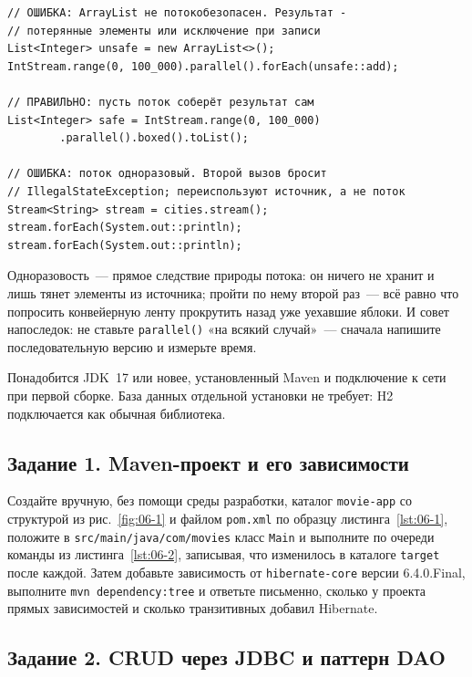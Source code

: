 \begin{listing}[H]
\begin{verbatim}
// ОШИБКА: ArrayList не потокобезопасен. Результат -
// потерянные элементы или исключение при записи
List<Integer> unsafe = new ArrayList<>();
IntStream.range(0, 100_000).parallel().forEach(unsafe::add);

// ПРАВИЛЬНО: пусть поток соберёт результат сам
List<Integer> safe = IntStream.range(0, 100_000)
        .parallel().boxed().toList();

// ОШИБКА: поток одноразовый. Второй вызов бросит
// IllegalStateException; переиспользуют источник, а не поток
Stream<String> stream = cities.stream();
stream.forEach(System.out::println);
stream.forEach(System.out::println);
\end{verbatim}
\caption{Ошибки параллельного и повторного использования потока}
\label{lst:06-21}
\end{listing}

Одноразовость~--- прямое следствие природы потока: он ничего не хранит и лишь
тянет элементы из источника; пройти по нему второй раз~--- всё равно что
попросить конвейерную ленту прокрутить назад уже уехавшие яблоки. И совет
напоследок: не ставьте \texttt{parallel()} «на всякий случай»~--- сначала
напишите последовательную версию и измерьте время.

\praktikum{}

Понадобится JDK~17 или новее, установленный Maven и подключение к сети при
первой сборке. База данных отдельной установки не требует: H2 подключается как
обычная библиотека.

\subsection*{Задание 1. Maven-проект и его зависимости}

Создайте вручную, без помощи среды разработки, каталог \texttt{movie-app} со
структурой из рис.~\ref{fig:06-1} и файлом \texttt{pom.xml} по образцу
листинга~\ref{lst:06-1}, положите в \texttt{src/main/java/com/movies} класс
\texttt{Main} и выполните по очереди команды из листинга~\ref{lst:06-2},
записывая, что изменилось в каталоге \texttt{target} после каждой. Затем
добавьте зависимость от \texttt{hibernate-core} версии 6.4.0.Final, выполните
\texttt{mvn dependency:tree} и ответьте письменно, сколько у проекта прямых
зависимостей и сколько транзитивных добавил Hibernate.

\subsection*{Задание 2. CRUD через JDBC и паттерн DAO}


